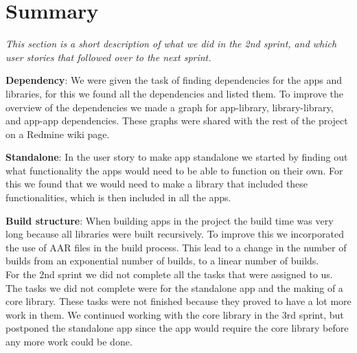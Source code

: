 \section{Summary} 
\textit{This section is a short description of what we did in the 2nd sprint, and which user stories that followed over to the next sprint.}

\textbf{Dependency}:
We were given the task of finding dependencies for the apps and libraries, for this we found all the dependencies and listed them. To improve the overview of the dependencies we made a graph for app-library, library-library, and app-app dependencies. These graphs were shared with the rest of the project on a Redmine wiki page.

\textbf{Standalone}:
In the user story to make app standalone we started by finding out what functionality the apps would need to be able to function on their own. For this we found that we would need to make a library that included these functionalities, which is then included in all the apps.

\textbf{Build structure}:
When building apps in the project the build time was very long because all libraries were built recursively. To improve this we incorporated the use of AAR files in the build process. This lead to a change in the number of builds from an exponential number of builds, to a linear number of builds.\\

For the 2nd sprint we did not complete all the tasks that were assigned to us. The tasks we did not complete were for the standalone app and the making of a core library. These tasks were not finished because they proved to have a lot more work in them. We continued working with the core library in the 3rd sprint, but postponed the standalone app since the app would require the core library before any more work could be done.